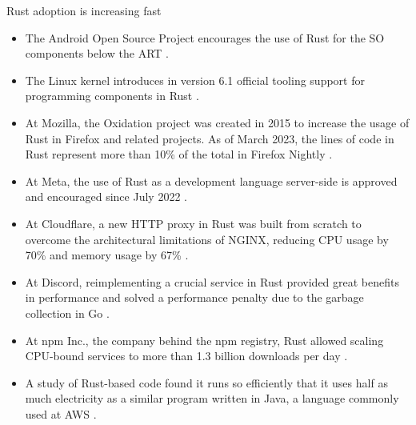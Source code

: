 \documentclass{beamer}
\begin{document}
\begin{frame}{Rust adoption is increasing fast}
  \scriptsize
  \begin{itemize}
    \item The Android Open Source Project encourages
          the use of Rust for the SO components
          below the ART \cite{stoep2021}.
    \item The Linux kernel introduces in version 6.1 official tooling
          support for programming components in Rust \cite{corbet2022,desimone2022}.
    \item At Mozilla, the Oxidation project was created in 2015
          to increase the usage of Rust in Firefox and related projects.
          As of March 2023, the lines of code in Rust represent more than
          10\% of the total in Firefox Nightly \cite{mozilla-oxidation}.
    \item At Meta, the use of Rust as a development language server-side
          is approved and encouraged since July 2022 \cite{garcia2022}.
    \item At Cloudflare, a new HTTP proxy in Rust was built from scratch
          to overcome the architectural limitations of NGINX,
          reducing CPU usage by 70\% and memory usage by 67\% \cite{wu2022}.
    \item At Discord, reimplementing a crucial service
          in Rust provided great benefits in performance
          and solved a performance penalty due to the garbage collection in Go \cite{howarth2020}.
    \item At npm Inc., the company behind the npm registry, Rust allowed scaling CPU-bound services
          to more than 1.3 billion downloads per day \cite{rust-npm-case-study}.
    \item A study of Rust-based code found it runs so efficiently
          that it uses half as much electricity as a similar program written in Java,
          a language commonly used at AWS \cite{pereira2017energy}.
  \end{itemize}
\end{frame}
\end{document}
